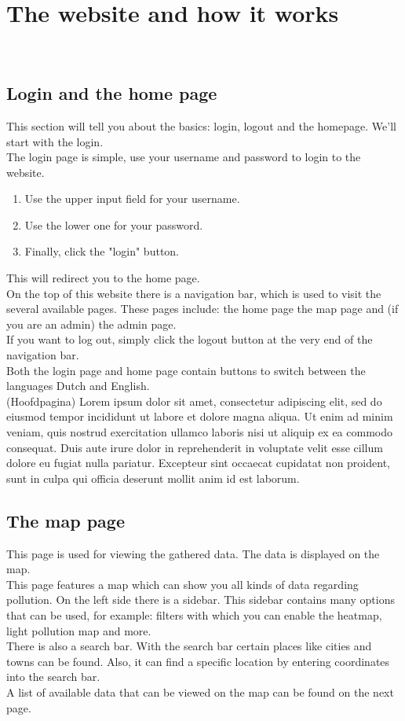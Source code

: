 \documentclass[a4paper]{article}
\begin{document}
\pagebreak

\section{The website and how it works}
~\\

\subsection{Login and the home page}
This section will tell you about the basics: login, logout and the homepage. We'll start with the login.
\\
The login page is simple, use your username and password to login to the website.

\begin{enumerate}
\item Use the upper input field for your username.
\item Use the lower one for your password.
\item Finally, click the "login" button.
\end{enumerate}

\noindent
This will redirect you to the home page.
\\
On the top of this website there is a navigation bar, which is used to visit the several available pages. These pages include: the home page the map page and (if you are an admin) the admin page.
\\
If you want to log out, simply click the logout button at the very end of the navigation bar.
\\
Both the login page and home page contain buttons to switch between the languages Dutch and English.
\\
(Hoofdpagina)
Lorem ipsum dolor sit amet, consectetur adipiscing elit, sed do eiusmod tempor incididunt ut labore et dolore magna aliqua. Ut enim ad minim veniam, quis nostrud exercitation ullamco laboris nisi ut aliquip ex ea commodo consequat. Duis aute irure dolor in reprehenderit in voluptate velit esse cillum dolore eu fugiat nulla pariatur. Excepteur sint occaecat cupidatat non proident, sunt in culpa qui officia deserunt mollit anim id est laborum.
~\\

\subsection{The map page}
This page is used for viewing the gathered data. The data is displayed on the map.
\\
This page features a map which can show you all kinds of data regarding pollution. On the left side there is a sidebar. This sidebar contains many options that can be used, for example: filters with which you can enable the heatmap, light pollution map and more.
\\
There is also a search bar. With the search bar certain places like cities and towns can be found. Also, it can find a specific location by entering coordinates into the search bar.
\\
A list of available data that can be viewed on the map can be found on the next page.
\end{document}
